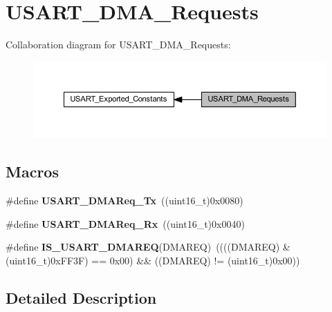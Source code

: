 \hypertarget{group___u_s_a_r_t___d_m_a___requests}{}\section{U\+S\+A\+R\+T\+\_\+\+D\+M\+A\+\_\+\+Requests}
\label{group___u_s_a_r_t___d_m_a___requests}
Collaboration diagram for U\+S\+A\+R\+T\+\_\+\+D\+M\+A\+\_\+\+Requests\+:\nopagebreak
\begin{figure}[H]
\begin{center}
\leavevmode
\includegraphics[width=350pt]{group___u_s_a_r_t___d_m_a___requests}
\end{center}
\end{figure}
\subsection*{Macros}
\begin{DoxyCompactItemize}
\item 
\mbox{\label{group___u_s_a_r_t___d_m_a___requests_gae38097d8f82ba969c9812194022cae9a}} 
\#define {\bfseries U\+S\+A\+R\+T\+\_\+\+D\+M\+A\+Req\+\_\+\+Tx}~((uint16\+\_\+t)0x0080)
\item 
\mbox{\label{group___u_s_a_r_t___d_m_a___requests_gaf33c13abb942251afab3297d8b8362ca}} 
\#define {\bfseries U\+S\+A\+R\+T\+\_\+\+D\+M\+A\+Req\+\_\+\+Rx}~((uint16\+\_\+t)0x0040)
\item 
\mbox{\label{group___u_s_a_r_t___d_m_a___requests_ga8be7a899d21d82de2ee0a763b4564dc3}} 
\#define {\bfseries I\+S\+\_\+\+U\+S\+A\+R\+T\+\_\+\+D\+M\+A\+R\+EQ}(D\+M\+A\+R\+EQ)~((((D\+M\+A\+R\+EQ) \& (uint16\+\_\+t)0x\+F\+F3\+F) == 0x00) \&\& ((\+D\+M\+A\+R\+E\+Q) != (uint16\+\_\+t)0x00))
\end{DoxyCompactItemize}


\subsection{Detailed Description}
